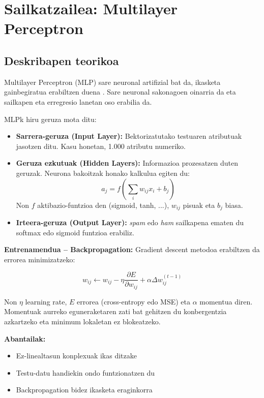 \documentclass[12pt, a4paper]{article}
\begin{document}
\section{Sailkatzailea: Multilayer Perceptron}

\subsection{Deskribapen teorikoa}

Multilayer Perceptron (MLP) sare neuronal artifizial bat da, ikasketa gainbegiratua
erabiltzen duena \cite{goodfellow2016, bishop2006}. Sare neuronal sakonagoen oinarria
da eta sailkapen eta erregresio lanetan oso erabilia da.

MLPk hiru geruza mota ditu:

\begin{itemize}
    \item \textbf{Sarrera-geruza (Input Layer):} Bektorizatutako testuaren atributuak
    jasotzen ditu. Kasu honetan, 1.000 atributu numeriko.
    \item \textbf{Geruza ezkutuak (Hidden Layers):} Informazioa prozesatzen duten
    geruzak. Neurona bakoitzak honako kalkulua egiten du:
    \begin{equation}
        a_j = f\!\left(\sum_{i} w_{ij} x_i + b_j\right)
    \end{equation}
    Non $f$ aktibazio-funtzioa den (sigmoid, tanh, ...), $w_{ij}$ pisuak
    eta $b_j$ biasa.
    \item \textbf{Irteera-geruza (Output Layer):} \textit{spam} edo \textit{ham}
    sailkapena ematen du softmax edo sigmoid funtzioa erabiliz.
\end{itemize}

\textbf{Entrenamendua -- Backpropagation:}
Gradient descent metodoa erabiltzen da errorea minimizatzeko:

\begin{equation}
    w_{ij} \leftarrow w_{ij}
    - \eta \frac{\partial E}{\partial w_{ij}}
    + \alpha \Delta w_{ij}^{(t-1)}
\end{equation}

Non $\eta$ learning rate, $E$ errorea (cross-entropy edo MSE) eta
$\alpha$ momentua diren. Momentuak aurreko eguneraketaren zati bat gehitzen
du konbergentzia azkartzeko eta minimum lokaletan ez blokeatzeko.

\textbf{Abantailak:}
\begin{itemize}
    \item Ez-linealtasun konplexuak ikas ditzake
    \item Testu-datu handiekin ondo funtzionatzen du
    \item Backpropagation bidez ikasketa eraginkorra
\end{itemize}
\end{document}
